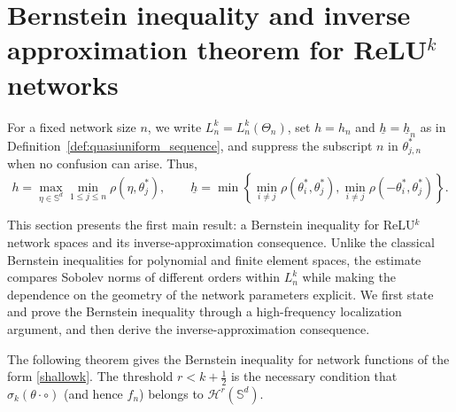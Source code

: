 \documentclass{article}
\numberwithin{equation}{section}
\def\SS{\mathbb{S}}
\def\mal{\max\limits}
\def\mil{\min\limits}
\begin{document}
\section{Bernstein inequality and inverse approximation theorem for ReLU$^k$ networks}\label{sec_bernstein}

For a fixed network size $n$, we write $L_n^k=L_n^k(\Theta_n)$, set $h=h_n$ and $\underline h=\underline h_n$ as in Definition~\ref{def:quasiuniform_sequence}, and suppress the subscript $n$ in $\theta_{j,n}^*$ when no confusion can arise. Thus,
\begin{equation}
h=\mal_{\eta\in\SS^d}\mil_{1\leq j\leq n}\rho(\eta,\theta_j^*),\qquad\underline h=\min\left\{\min_{i\neq j}\rho(\theta_i^*,\theta_j^*),\min_{i\neq j}\rho(-\theta_i^*,\theta_j^*)\right\}.
\end{equation}

This section presents the first main result: a Bernstein inequality for ReLU$^k$ network spaces and its inverse-approximation consequence. Unlike the classical Bernstein inequalities for polynomial and finite element spaces, the estimate compares Sobolev norms of different orders within $L_n^k$ while making the dependence on the geometry of the network parameters explicit. We first state and prove the Bernstein inequality through a high-frequency localization argument, and then derive the inverse-approximation consequence.

The following theorem gives the Bernstein inequality for network functions of the form \eqref{shallowk}. The threshold $r<k+\frac12$ is the necessary condition that $\sigma_k(\theta\cdot\circ)$ (and hence $f_n$) belongs to $\mathcal{H}^r(\SS^d)$.
\end{document}
